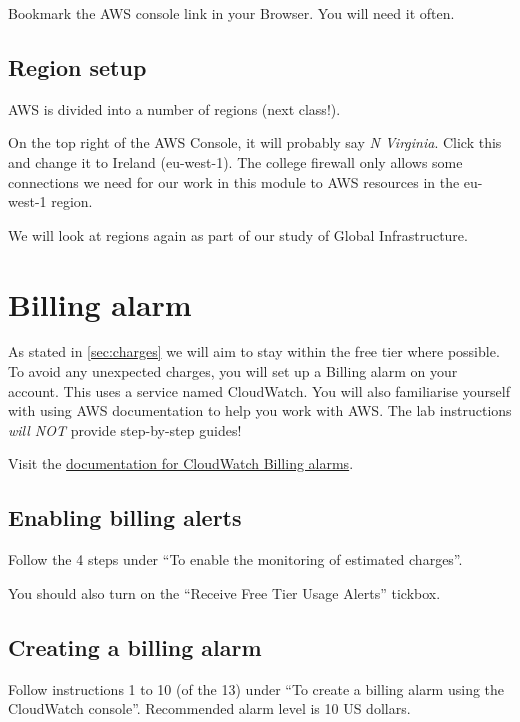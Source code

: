 Bookmark the AWS console link in your Browser. You will need it often.


\subsection{Region setup}
\label{sec:region-setup}

AWS is divided into a number of regions (next class!).

On the top right of the AWS Console, it will probably say \textit{N Virginia}.
Click this and change it to Ireland (eu-west-1).
The college firewall only allows some connections we need for our work in this module to AWS resources in the eu-west-1 region.

We will look at regions again as part of our study of Global Infrastructure.

\section{Billing alarm}

As stated in \autoref{sec:charges} we will aim to stay within the free tier where possible.
To avoid any unexpected charges, you will set up a Billing alarm on your account.
This uses a service named CloudWatch.
You will also familiarise yourself with using AWS documentation to help you work with AWS.
The lab instructions \textit{will NOT} provide step-by-step guides!

Visit the \href{https://docs.aws.amazon.com/AmazonCloudWatch/latest/monitoring/monitor_estimated_charges_with_cloudwatch.html}{documentation for CloudWatch Billing alarms}.

\subsection{Enabling billing alerts}

Follow the 4 steps under ``To enable the monitoring of estimated charges''.

You should also turn on the ``Receive Free Tier Usage Alerts'' tickbox.

\subsection{Creating a billing alarm}

Follow instructions 1 to 10 (of the 13) under ``To create a billing alarm using the CloudWatch console''.
Recommended alarm level is 10 US dollars.

